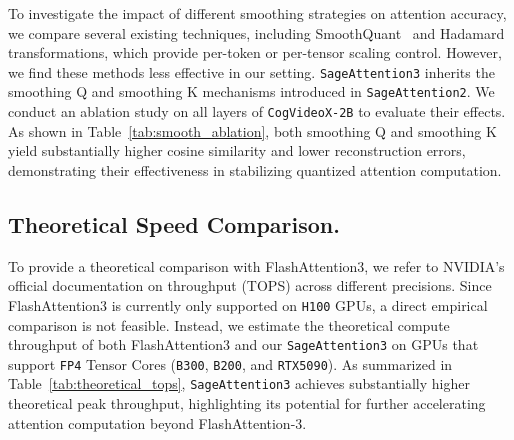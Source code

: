 To investigate the impact of different smoothing strategies on attention accuracy, we compare several existing techniques, including SmoothQuant~\citep{xiao2023smoothquant} and Hadamard transformations, which provide per-token or per-tensor scaling control. However, we find these methods less effective in our setting.
\texttt{SageAttention3} inherits the smoothing Q and smoothing K mechanisms introduced in \texttt{SageAttention2}.
We conduct an ablation study on all layers of \texttt{CogVideoX-2B} to evaluate their effects.
As shown in Table~\ref{tab:smooth_ablation}, both smoothing Q and smoothing K yield substantially higher cosine similarity and lower reconstruction errors, demonstrating their effectiveness in stabilizing quantized attention computation.


\subsection{Theoretical Speed Comparison.} 

\begin{table}[H]
\centering
\vspace{-.5em}
\caption{Theoretical throughput comparison between FlashAttention3 and \texttt{SageAttention3} across different GPUs.}
\label{tab:theoretical_tops}
\end{table}

To provide a theoretical comparison with FlashAttention3, we refer to NVIDIA’s official documentation on throughput (TOPS) across different precisions. Since FlashAttention3 is currently only supported on \texttt{H100} GPUs, a direct empirical comparison is not feasible. Instead, we estimate the theoretical compute throughput of both FlashAttention3 and our \texttt{SageAttention3} on GPUs that support \texttt{FP4} Tensor Cores (\texttt{B300}, \texttt{B200}, and \texttt{RTX5090}).
As summarized in Table~\ref{tab:theoretical_tops}, \texttt{SageAttention3} achieves substantially higher theoretical peak throughput, highlighting its potential for further accelerating attention computation beyond FlashAttention-3.

